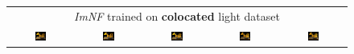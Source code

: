 \begin{figure}[!htb]
\begin{tabular*}{\textwidth}{ c c c c c }
        \multicolumn{5}{c}{\textit{ImNF} trained on \textbf{colocated} light dataset} \\
          \includegraphics[width=0.19\textwidth]{figures/results/arb_set/dynamic_light/imnf_coloc_vc0_ld-90.png}
        & \includegraphics[width=0.19\textwidth]{figures/results/arb_set/dynamic_light/imnf_coloc_vc0_ld-60.png}
        & \includegraphics[width=0.19\textwidth]{figures/results/arb_set/dynamic_light/imnf_coloc_vc0_ld0.png}
        & \includegraphics[width=0.19\textwidth]{figures/results/arb_set/dynamic_light/imnf_coloc_vc0_ld60.png} 
        & \includegraphics[width=0.19\textwidth]{figures/results/arb_set/dynamic_light/imnf_coloc_vc0_ld90.png} \\


\end{tabular*}
\end{figure}
